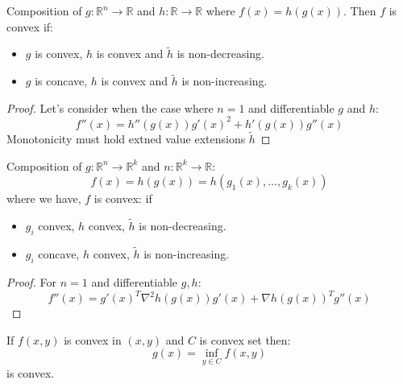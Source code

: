 \begin{proposition}
    Composition of $g:\mathbb{R}^n\rightarrow \mathbb{R}$ and $h:\mathbb{R}\rightarrow \mathbb{R}$ where $f(x) = h(g(x))$. Then $f$ is convex if:
    \begin{itemize}
        \item $g$ is convex, $h$ is convex and $\tilde{h}$ is non-decreasing.
        \item $g$ is concave, $h$ is convex and $\tilde{h}$ is non-increasing.
    \end{itemize}
\end{proposition}
\begin{proof}
    Let's consider when the case where $n=1$ and differentiable $g$ and $h$:
    \begin{equation*}
        f''(x) = h''(g(x))g'(x)^2 + h'(g(x))g''(x)
    \end{equation*}
    Monotonicity must hold extned value extensions $\tilde{h}$
\end{proof}

\begin{proposition}
    Composition of $g:\mathbb{R}^n\rightarrow \mathbb{R}^k$ and $n : \mathbb{R}^k\rightarrow \mathbb{R}$:
    \begin{equation*}
        f(x) = h(g(x)) = h(g_1(x), \dots, g_k(x))
    \end{equation*}
    where we have, $f$ is convex: if 
    \begin{itemize}
        \item $g_i$ convex, $h$ convex, $\tilde{h}$ is non-decreasing.
        \item $g_i$ concave, $h$ convex, $\tilde{h}$ is non-increasing.
    \end{itemize}
\end{proposition}
\begin{proof}
    For $n = 1$ and differentiable $g, h$:
    \begin{equation*}
        f''(x) = g'(x)^T\nabla^2 h(g(x))g'(x) + \nabla h(g(x))^Tg''(x)
    \end{equation*}
\end{proof}

\begin{proposition}
    If $f(x, y)$ is convex in $(x, y)$ and $C$ is convex set then:
    \begin{equation*}
        g(x) = \inf_{y\in C} f(x, y)
    \end{equation*}
    is convex.
\end{proposition}

